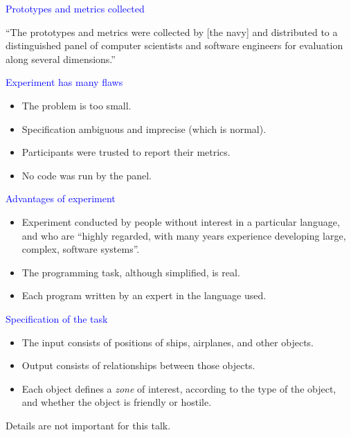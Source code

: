 \documentclass{slides}
\newcommand{\ti}[1]{\begin{center}\Large{\textcolor{blue}{#1}}\end{center}}
\begin{document}
\begin{slide}\ti{Prototypes and metrics collected}

``The prototypes and metrics were collected by [the navy] and
  distributed to a distinguished panel of computer scientists and
  software engineers for evaluation along several dimensions.''

\vfill\end{slide}
\begin{slide}\ti{Experiment has many flaws}

  \begin{itemize}
  \item The problem is too small.
  \item Specification ambiguous and imprecise (which is normal).
  \item Participants were trusted to report their metrics.
  \item No code was run by the panel.
  \end{itemize}

\vfill\end{slide}
\begin{slide}\ti{Advantages of experiment}

  \begin{itemize}
  \item Experiment conducted by people without interest in a
    particular language, and who are ``highly regarded, with many
    years experience developing large, complex, software systems''.
  \item The programming task, although simplified, is real.
  \item Each program written by an expert in the language used.
  \end{itemize}

\vfill\end{slide}
\begin{slide}\ti{Specification of the task}

  \begin{itemize}
  \item The input consists of positions of ships, airplanes, and other
    objects.
  \item Output consists of relationships between those objects.
  \item Each object defines a \emph{zone} of interest, according to
    the type of the object, and whether the object is friendly or
    hostile.
  \end{itemize}

Details are not important for this talk.

\vfill\end{slide}
\end{document}
